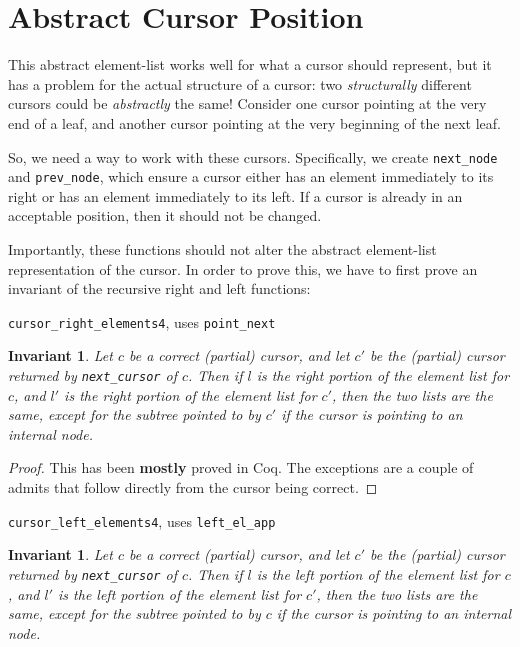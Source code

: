 \documentclass[12pt]{article}
\newtheorem{invariant}[theorem]{Invariant}
\begin{document}
\section{Abstract Cursor Position}

This abstract element-list works well for what a cursor should represent, but it has a problem for the actual structure of a cursor: two \textit{structurally} different cursors could be \textit{abstractly} the same! Consider one cursor pointing at the very end of a leaf, and another cursor pointing at the very beginning of the next leaf.

So, we need a way to work with these cursors. Specifically, we create \texttt{next\_node} and \texttt{prev\_node}, which ensure a cursor either has an element immediately to its right or has an element immediately to its left. If a cursor is already in an acceptable position, then it should not be changed.

Importantly, these functions should not alter the abstract element-list representation of the cursor. In order to prove this, we have to first prove an invariant of the recursive right and left functions:

\bigskip
\texttt{cursor\_right\_elements4}, uses \texttt{point\_next}

\begin{invariant}
Let $c$ be a correct (partial) cursor, and let $c'$ be the (partial) cursor returned by \texttt{next\_cursor} of $c$. Then if $l$ is the right portion of the element list for $c$, and $l'$ is the right portion of the element list for $c'$, then the two lists are the same, except for the subtree pointed to by $c'$ if the cursor is pointing to an internal node.
\end{invariant}

\begin{proof}
This has been \textbf{mostly} proved in Coq. The exceptions are a couple of admits that follow directly from the cursor being correct.
\end{proof}

\bigskip
\texttt{cursor\_left\_elements4}, uses \texttt{left\_el\_app}

\begin{invariant}
Let $c$ be a correct (partial) cursor, and let $c'$ be the (partial) cursor returned by \texttt{next\_cursor} of $c$. Then if $l$ is the left portion of the element list for $c$, and $l'$ is the left portion of the element list for $c'$, then the two lists are the same, except for the subtree pointed to by $c$ if the cursor is pointing to an internal node.
\end{invariant}
\end{document}
